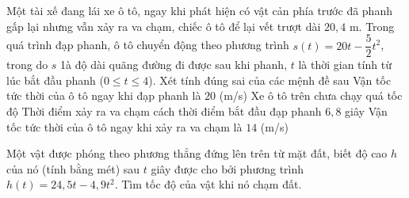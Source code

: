 \begin{ex}%
 Một tài xế đang lái xe ô tô, ngay khi phát hiện có vật cản phía trước đã phanh gấp lại nhưng vẫn xảy ra va chạm, chiếc ô tô để lại vết trượt dài $20{,}4$ m. Trong quá trình đạp phanh, ô tô chuyển động theo phương trình $s(t)=20t-\dfrac{5}{2}t^2$, trong do $s$ 1à độ dài quãng đường đi được sau khi phanh, $t$ là thời gian tính từ lúc bắt đầu phanh ($0\leq t\leq 4$). Xét tính  đúng sai của các mệnh đề sau
  \choiceTF
  {\True Vận tốc tức thời của ô tô ngay  khi đạp phanh là $20$ (m/s)}
  {Xe ô tô  trên chưa chạy quá tốc độ}
  {Thời điểm xảy ra va chạm cách thời điểm bắt  đầu đạp phanh $6{,}8$ giây}
  {\True Vận  tốc tức thời của ô tô ngay khi xảy ra va chạm là $14$ (m/s)}
\end{ex}



\begin{ex}%
	Một vật được phóng theo phương thẳng đứng lên trên từ mặt đất, biết độ cao $h$ của nó (tính bằng mét) sau $t$ giây được cho bởi  phương trình $h(t)=24{,}5t-4{,}9t^2$. Tìm tốc độ của vật khi nó chạm đất.
\end{ex}

